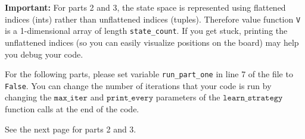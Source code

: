 \documentclass[submit]{harvardml}
\begin{document}
\begin{problem}
\begin{enumerate}
\textbf{Important: } For parts 2 and 3, the state space is represented using flattened indices (ints) rather than unflattened indices (tuples).  Therefore value function \texttt{V} is a 1-dimensional array of length \texttt{state\_count}.  If you get stuck, printing the unflattened indices (so you can easily visualize positions on the board) may help you debug your code.

For the following parts, please set variable \texttt{run\_part\_one} in line 7 of the file to \texttt{False}.  You can change the number of iterations that your code is run by changing the $\texttt{max\_iter}$ and $\texttt{print\_every}$ parameters of the $\texttt{learn\_strategy}$ function calls at the end of the code.

See the next page for parts 2 and 3.

\end{enumerate}
\end{problem}
\newpage
\end{document}
